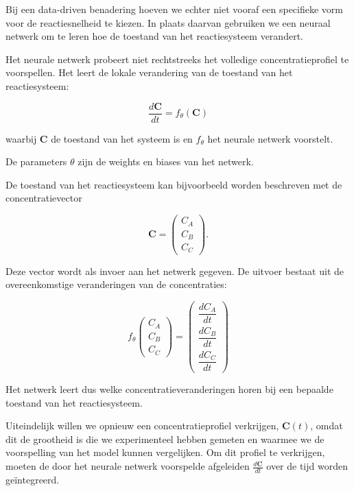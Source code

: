 \documentclass{ximera}
\begin{document}
Bij een data-driven benadering hoeven we echter niet vooraf een specifieke vorm voor de reactiesnelheid te kiezen. In plaats daarvan gebruiken we een neuraal netwerk om te leren hoe de toestand van het reactiesysteem verandert.

\begin{remark} \text{ }

Het neurale netwerk probeert niet rechtstreeks het volledige
concentratieprofiel te voorspellen. Het leert de lokale verandering van de toestand van het reactiesysteem:

\[
\boxed{
\frac{d\mathbf C}{dt}=f_\theta(\mathbf C)
}
\]

waarbij $\mathbf C$ de toestand van het systeem is en $f_\theta$ het
neurale netwerk voorstelt.

De parameters $\theta$ zijn de weights en biases van het netwerk.
\end{remark}

De toestand van het reactiesysteem kan bijvoorbeeld worden beschreven met de concentratievector

\[
\mathbf C=
\begin{pmatrix}
C_A\\
C_B\\
C_C
\end{pmatrix}.
\]

Deze vector wordt als invoer aan het netwerk gegeven. De uitvoer bestaat uit de overeenkomstige veranderingen van de concentraties:

\[
\boxed{
f_\theta
\begin{pmatrix}
C_A\\
C_B\\
C_C
\end{pmatrix}
=
\begin{pmatrix}
\dfrac{dC_A}{dt}\\[1mm]
\dfrac{dC_B}{dt}\\[1mm]
\dfrac{dC_C}{dt}
\end{pmatrix}
}
\]

Het netwerk leert dus welke concentratieveranderingen horen bij een
bepaalde toestand van het reactiesysteem.


Uiteindelijk willen we opnieuw een concentratieprofiel verkrijgen, $\mathbf{C}(t)$, omdat dit de grootheid is die we experimenteel hebben gemeten en waarmee we de voorspelling van het model kunnen vergelijken. Om dit profiel te verkrijgen, moeten de door het neurale netwerk voorspelde afgeleiden $\frac{d\mathbf{C}}{dt}$ over de tijd worden geïntegreerd.
\end{document}
